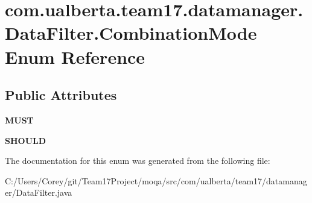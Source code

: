 \hypertarget{enumcom_1_1ualberta_1_1team17_1_1datamanager_1_1_data_filter_1_1_combination_mode}{\section{com.\+ualberta.\+team17.\+datamanager.\+Data\+Filter.\+Combination\+Mode Enum Reference}
\label{enumcom_1_1ualberta_1_1team17_1_1datamanager_1_1_data_filter_1_1_combination_mode}
}
\subsection*{Public Attributes}
\begin{DoxyCompactItemize}
\item 
\hypertarget{enumcom_1_1ualberta_1_1team17_1_1datamanager_1_1_data_filter_1_1_combination_mode_a0f31ba1706920be5071431d8c0448d5e}{{\bfseries M\+U\+S\+T}}\label{enumcom_1_1ualberta_1_1team17_1_1datamanager_1_1_data_filter_1_1_combination_mode_a0f31ba1706920be5071431d8c0448d5e}

\item 
\hypertarget{enumcom_1_1ualberta_1_1team17_1_1datamanager_1_1_data_filter_1_1_combination_mode_aad43221f817c3bf4720bacf22069694f}{{\bfseries S\+H\+O\+U\+L\+D}}\label{enumcom_1_1ualberta_1_1team17_1_1datamanager_1_1_data_filter_1_1_combination_mode_aad43221f817c3bf4720bacf22069694f}

\end{DoxyCompactItemize}


The documentation for this enum was generated from the following file\+:\begin{DoxyCompactItemize}
\item 
C\+:/\+Users/\+Corey/git/\+Team17\+Project/moqa/src/com/ualberta/team17/datamanager/Data\+Filter.\+java\end{DoxyCompactItemize}
